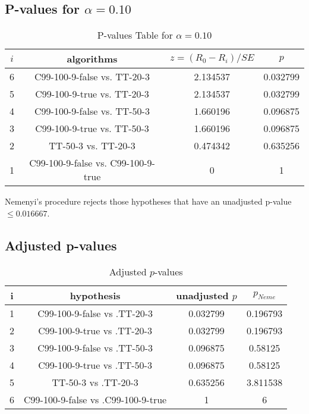 \documentclass[a4paper,10pt]{article}
\begin{document}
\begin{landscape}
\pagebreak

\subsection{P-values for $\alpha=0.10$}

\begin{table}[!htp]
\centering\scriptsize
\begin{tabular}{cccc}
$i$&algorithms&$z=(R_0 - R_i)/SE$&$p$\\
\hline6&C99-100-9-false vs. TT-20-3&2.134537&0.032799\\
5&C99-100-9-true vs. TT-20-3&2.134537&0.032799\\
4&C99-100-9-false vs. TT-50-3&1.660196&0.096875\\
3&C99-100-9-true vs. TT-50-3&1.660196&0.096875\\
2&TT-50-3 vs. TT-20-3&0.474342&0.635256\\
1&C99-100-9-false vs. C99-100-9-true&0&1\\
\hline
\end{tabular}
\caption{P-values Table for $\alpha=0.10$}
\end{table}Nemenyi's procedure rejects those hypotheses that have an unadjusted p-value $\le0.016667$.

\pagebreak

\subsection{Adjusted p-values}

\begin{table}[!htp]
\centering\scriptsize
\begin{tabular}{cccc}
i&hypothesis&unadjusted $p$&$p_{Neme}$\\
\hline1&C99-100-9-false vs .TT-20-3&0.032799&0.196793\\
2&C99-100-9-true vs .TT-20-3&0.032799&0.196793\\
3&C99-100-9-false vs .TT-50-3&0.096875&0.58125\\
4&C99-100-9-true vs .TT-50-3&0.096875&0.58125\\
5&TT-50-3 vs .TT-20-3&0.635256&3.811538\\
6&C99-100-9-false vs .C99-100-9-true&1&6\\
\hline
\end{tabular}
\caption{Adjusted $p$-values}
\end{table}

\end{landscape}
\end{document}
